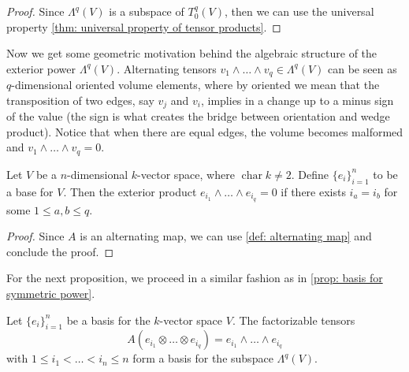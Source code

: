 \begin{proof}
  Since \(\Lambda^q(V)\) is a subspace of \(T_0^q(V)\), then we can use the
  universal property \cref{thm: universal property of tensor products}.
\end{proof}

Now we get some geometric motivation behind the algebraic structure of the
exterior power \(\Lambda^q(V)\). Alternating tensors \(v_1 \wedge \dots \wedge
v_q \in \Lambda^q(V)\) can be seen as \(q\)-dimensional oriented volume elements,
where by oriented we mean that the transposition of two edges, say \(v_j\) and
\(v_i\), implies in a change up to a minus sign of the value (the sign is what
creates the bridge between orientation and wedge product). Notice that when
there are equal edges, the volume becomes malformed and \(v_1 \wedge \dots
\wedge v_q = 0\).

\begin{proposition}
  Let \(V\) be a \(n\)-dimensional \(k\)-vector space, where
  \(\operatorname{char} k \neq 2\). Define \(\{e_i\}_{i=1}^n\) to be a base for
  \(V\). Then the exterior product \(e_{i_1} \wedge \dots \wedge e_{i_q} = 0\)
  if there exists \(i_a = i_b\) for some \(1 \leq a, b \leq q\).
\end{proposition}

\begin{proof}
  Since \(A\) is an alternating map, we can use \cref{def: alternating map} and
  conclude the proof.
\end{proof}

For the next proposition, we proceed in a similar fashion as in \cref{prop:
basis for symmetric power}.

\begin{proposition}
  \label{prop: exterior power basis}
  Let \(\{e_i\}_{i=1}^n\) be a basis for the \(k\)-vector space \(V\). The
  factorizable tensors
  \[
    A(e_{i_1} \otimes \dots \otimes e_{i_q}) = e_{i_1} \wedge \dots \wedge
    e_{i_q}
  \] 
  with \(1 \leq i_1 < \dots < i_n \leq n\) form a basis for the subspace
  \(\Lambda^q(V)\).
\end{proposition}

